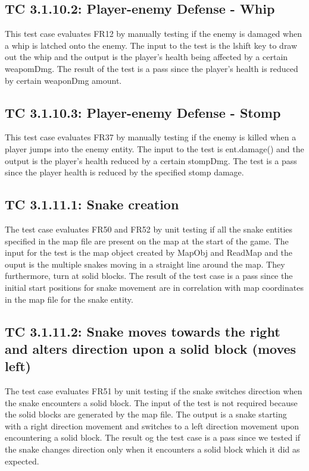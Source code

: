 \documentclass[12pt, titlepage]{article}
\begin{document}
\subsection*{TC 3.1.10.2: Player-enemy Defense - Whip}

This test case evaluates FR12 by manually testing if the enemy is damaged when a whip is latched onto the enemy. The input to the test is the lshift key to draw out the whip and the output is the player's health being affected by a certain weapomDmg. The result of the test is a pass since the player's health is reduced by certain weaponDmg amount.
\subsection*{TC 3.1.10.3: Player-enemy Defense - Stomp}
This test case evaluates FR37 by manually testing if the enemy is killed when a player jumps into the enemy entity. The input to the test is ent.damage() and the output is the player's health reduced by a certain stompDmg. The test is a pass since the player health is reduced by the specified stomp damage.
\subsection*{TC 3.1.11.1: Snake creation}
The test case evaluates FR50 and FR52 by unit testing if all the snake entities specified in the map file are present on the map at the start of the game. The input for the test is the map object created by MapObj and ReadMap and the ouput is the multiple snakes moving in a straight line around the map. They furthermore, turn at solid blocks. The result of the test case is a pass since the initial start positions for snake movement are in correlation with map coordinates in the map file for the snake entity.
\subsection*{TC 3.1.11.2: Snake moves towards the right and alters direction upon a solid block (moves left)}
The test case evaluates FR51 by unit testing if the snake switches direction when the snake encounters a solid block. The input of the test is not required because the solid blocks are generated by the map file. The output is a snake starting with a right direction movement and switches to a left direction movement upon encountering a solid block. The result og the test case is a pass since we tested if the snake changes direction only when it encounters a solid block which it did as expected.
\end{document}

